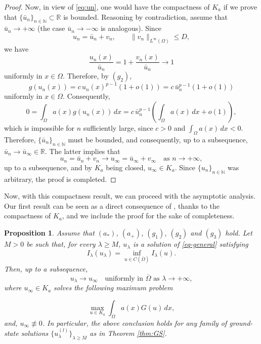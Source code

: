 \documentclass[11pt,reqno]{amsart}
\theoremstyle{plain}
\newtheorem{proposition}[theorem]{Proposition}
\theoremstyle{definition}
\numberwithin{equation}{section}
\newcommand{\R}{\mathbb{R}}
\newcommand{\N}{\mathbb{N}}
\begin{document}
\begin{proof}
    Now, in view of \eqref{eq:un}, one would have the compactness of $K_a$ if we prove that $\{\bar u_n\}_{n \in \N} \subset \R$ is bounded. Reasoning by contradiction, assume that $\bar u_n\to+\infty$
(the case $\bar u_n\to-\infty$ is analogous). Since
$$
u_n=\bar u_n+v_n,
\qquad
\|v_n\|_{L^\infty(\Omega)}\le D,
$$
we have
$$
\frac{u_n(x)}{\bar u_n}
=
1+\frac{v_n(x)}{\bar u_n}
\to1
$$
uniformly in $x\in\Omega$. Therefore, by $(g_2)$,
$$
g(u_n(x)) = c\,u_n(x)^{p-1}(1+o(1)) = c\,\bar u_n^{p-1}(1+o(1))
$$
uniformly in $x\in\Omega$. Consequently,
$$
0 = \int_\Omega a(x)g(u_n(x))\,dx = c\,\bar u_n^{p-1} \left( \int_\Omega a(x)\,dx+o(1) \right),
$$
which is impossible for $n$ sufficiently large, since $c>0$ and $\int_\Omega a(x)\,dx<0$. Therefore, $\{ \bar u _n\}_{n \in \N}$ must be bounded, and consequently, up to a subsequence, $\bar u _n \to \bar u_\infty \in \R$. The latter implies that
    $$u_n = \bar u_n + v_n \to u_\infty = \bar u_\infty + v_\infty \quad \text{as } n \to +\infty,$$
    up to a subsequence, and by $K_a$ being closed, $u_\infty \in K_a$. Since $\{u_n\}_{n \in \N}$ was arbitrary, the proof is completed.

\end{proof}
Now, with this compactness result, we can proceed with the asymptotic analysis. Our first result can be seen as a direct consequence of {\cite[Proposition 2.17]{BoCoZi26}}, thanks to the compactness of $K_a$, and we include the proof for the sake of completeness.

\begin{proposition} \label{prop:asGS}
    Assume that $(a_*)$, $(a_+)$, $(g_1)$, $(g_2)$ and $(g_3)$ hold. Let $M >0$ be such that, for every $\lambda \geq M$, $u_\lambda$ is a solution of \eqref{eq-general} satisfying
    \begin{equation} \label{eq:infchar}I_\lambda(u_\lambda) = \inf_{u \in C(\overline{\Omega})} I_\lambda(u). \end{equation}
    Then, up to a subsequence,
    $$u_\lambda \to u_\infty \quad \text{uniformly in $\overline \Omega $ as } \lambda \to + \infty,$$
    where $u_\infty \in K_a$ solves the following maximum problem

    \begin{equation} \label{eq:varmax}
    \max_{u \in K_a} \int_\Omega a(x) G(u) \, dx,\end{equation}
    and, $u_\infty \not \equiv 0$. In particular, the above conclusion holds for any family of ground-state solutions $\{u_\lambda^{(l)} \}_{\lambda \geq M}$ as in Theorem \ref{thm:GS}.
\end{proposition}
\end{document}

